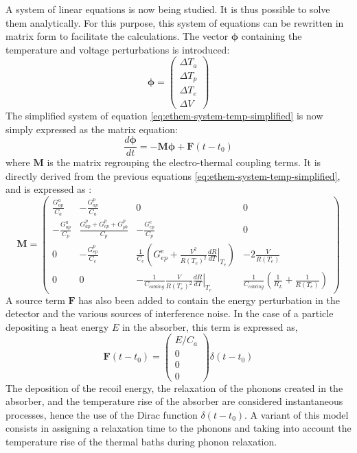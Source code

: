 A system of linear equations is now being studied. It is thus possible to solve them analytically. For this purpose, this system of equations can be rewritten in matrix form to facilitate the calculations. The vector $\bm{\phi}$ containing the temperature and voltage perturbations is introduced:
\begin{equation}
\label{eq:ethem-phi}
\bm{\phi} = 
\left( \begin{array}{c}
\Delta T_a\\
\Delta T_p\\
\Delta T_e\\
\Delta V
\end{array} \right)
\end{equation}
The simplified system of equation \ref{eq:ethem-system-temp-simplified} is now simply expressed as the matrix equation:
\begin{equation}
\label{eq:ethem-matrix-eq}
\frac{d \bm{\phi}}{d t}= - \bm{M} \bm{\phi} + \bm{F}(t-t_0)
\end{equation}
where $\bm{M}$ is the matrix regrouping the electro-thermal coupling terms. It is directly derived from the previous equations \ref{eq:ethem-system-temp-simplified}, and is expressed as :
\begin{equation}
\label{eq:ethem-coupling-mat}
\bm{M} = 
\left( \begin{array}{cccc}
 \frac{G_{ap}^a}{C_a}&-\frac{G_{ap}^p}{C_a}&0&0 \\
 -\frac{G_{ap}^a}{C_p}&\frac{G_{ap}^p+G_{ep}^p+G_{pb}^p}{C_p}&-\frac{G_{ep}^e}{C_p}&0 \\
0&-\frac{G_{ep}^p}{C_e}&\frac{1}{C_e}\left(G_{ep}^e + \frac{V^2}{R(T_e)^2}  \left.\frac{d R}{d T}\right\vert_{T_e} \right)&-2\frac{V}{R(T_e)}\\
0&0&-\frac{1}{C_{cabling}}\frac{V}{R(T_e)^2} \left.\frac{d R}{d T}\right\vert_{T_e} &\frac{1}{C_{cabling}}\left( \frac{1}{R_L} + \frac{1}{R(T_e)} \right)
\end{array} \right)
\end{equation}
A source term $\bm{F}$ has also been added to contain the energy perturbation in the detector and the various sources of interference noise. In the case of a particle depositing a heat energy $E$ in the absorber, this term is expressed as,
\begin{equation}
\bm{F}(t-t_0) = 
\left( \begin{array}{c}
E/C_a \\
0 \\
0 \\
0
\end{array} \right) \delta (t-t_0)
\end{equation}
The deposition of the recoil energy, the relaxation of the phonons created in the absorber, and the temperature rise of the absorber are considered instantaneous processes, hence the use of the Dirac function $\delta (t-t_0)$. A variant of this model consists in assigning a relaxation time to the phonons and taking into account the temperature rise of the thermal baths during phonon relaxation.

